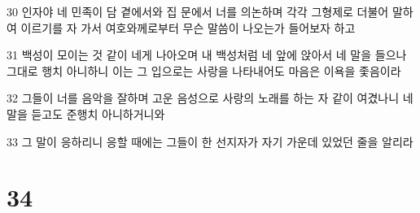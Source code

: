 \par 30 인자야 네 민족이 담 곁에서와 집 문에서 너를 의논하며 각각 그형제로 더불어 말하여 이르기를 자 가서 여호와께로부터 무슨 말씀이 나오는가 들어보자 하고
\par 31 백성이 모이는 것 같이 네게 나아오며 내 백성처럼 네 앞에 앉아서 네 말을 들으나 그대로 행치 아니하니 이는 그 입으로는 사랑을 나타내어도 마음은 이욕을 좇음이라
\par 32 그들이 너를 음악을 잘하며 고운 음성으로 사랑의 노래를 하는 자 같이 여겼나니 네 말을 듣고도 준행치 아니하거니와
\par 33 그 말이 응하리니 응할 때에는 그들이 한 선지자가 자기 가운데 있었던 줄을 알리라

\chapter{34}

